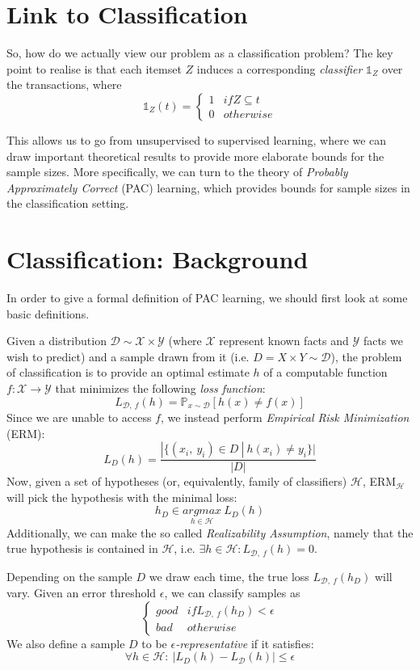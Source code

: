 \documentclass[11pt]{sigplanconf}
\renewcommand\it{\textit}
\renewcommand\H{\mathcal{H}}
\newcommand\D{\mathcal{D}}
\newcommand\X{\mathcal{X}}
\newcommand\Y{\mathcal{Y}}
\renewcommand\P{\mathds{P}}
\newcommand\one{\mathds{1}}
\begin{document}
\section{Link to Classification}
So, how do we actually view our problem as a classification problem? The key point to realise is 
that each itemset $Z$ induces a corresponding \it{classifier} $\one_Z$ over the transactions, where 
\[ \one_Z(t) = \begin{cases}
1 & if Z \subseteq t \\
0 & otherwise
\end{cases}
\]

This allows us to go from unsupervised  to supervised learning, where we can draw important theoretical results to provide more elaborate bounds for the sample sizes. More specifically, we can turn to the theory of \it{Probably Approximately Correct} (PAC) learning, which provides bounds for sample sizes in the classification setting.

\section{Classification: Background}
In order to give a formal definition of PAC learning, we should first look at some basic definitions.

Given a distribution $\D \sim \X \times \Y$ (where $\X$ represent known facts and $\Y$ facts we wish to predict) and a sample drawn from it (i.e. $D = X \times Y \sim \D$), the problem of classification is to provide an optimal estimate $h$ of a computable function $f : \X \to \Y$ that minimizes the following \it{loss function}:
\[ L_{\D,\ f}(h) = \P_{x \sim \D}[h(x) \neq f(x)]
\]
Since we are unable to access $f$, we instead perform \it{Empirical Risk Minimization} (ERM):
\[ L_D(h) = \frac{|\{ (x_i,\ y_i) \in D \ | \ h(x_i) \neq y_i \}|}{|D|}
\]
Now, given a set of hypotheses (or, equivalently, family of classifiers) $\H$, ERM$_{\H}$ will pick the hypothesis with the minimal loss:
\[ h_D \in \underset{h \in \H}{argmax} \ L_D(h)
\]
Additionally, we can make the so called \it{Realizability Assumption}, namely that the true hypothesis is contained in $\H$, i.e. $\exists h \in \H : L_{\D,\ f}(h) = 0$.

Depending on the sample $D$ we draw each time, the true loss $L_{\D,\ f}(h_D)$ will vary. Given an error threshold $\epsilon$, we can classify samples as
\[
\begin{cases}
\it{good} & if L_{\D,\ f}(h_D) < \epsilon \\
\it{bad}  & otherwise
\end{cases}
\]
We also define a sample $D$ to be \it{$\epsilon$-representative} if it satisfies:
\[ \forall h \in \H : \ |L_D(h) - L_{\D}(h)| \leq \epsilon
\]
\end{document}
